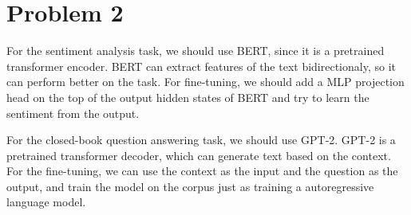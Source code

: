 \documentclass[a4 paper,12pt]{article}
\begin{document}
\section*{Problem 2}
For the sentiment analysis task, we should use BERT, since it is a pretrained transformer encoder. BERT can extract features of the text bidirectionaly, so it can perform better on the task. For fine-tuning, we should add a MLP projection head on the top of the output hidden states of BERT and try to learn the sentiment from the output. 

For the closed-book question answering task, we should use GPT-2. GPT-2 is a pretrained transformer decoder, which can generate text based on the context. For the fine-tuning, we can use the context as the input and the question as the output, and train the model on the corpus just as training a autoregressive language model.


\end{document}

